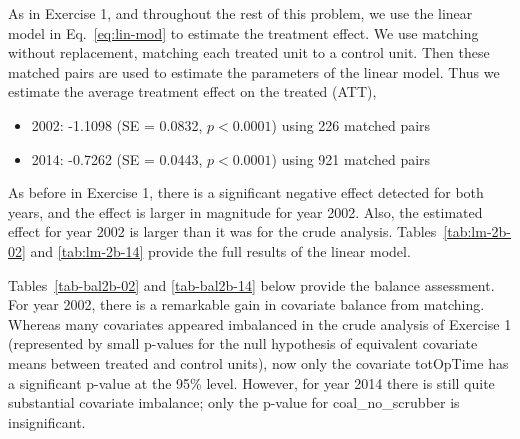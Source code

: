 \begin{enumerate}[(a)]
  As in Exercise 1, and throughout the rest of this problem, we use the
  linear model in Eq.~\eqref{eq:lin-mod} to estimate the treatment
  effect.  We use matching without replacement, matching each treated
  unit to a control unit.  Then these matched pairs are used to
  estimate the parameters of the linear model.  Thus we estimate the
  average treatment effect on the treated (ATT), 
  \begin{itemize}
  \item 2002: -1.1098 (SE = 0.0832, $p < 0.0001$) using 226 matched
    pairs
  \item 2014: -0.7262 (SE = 0.0443, $p < 0.0001$) using 921 matched
    pairs
  \end{itemize}
  As before in Exercise 1, there is a significant negative effect
  detected for both years, and the effect is larger in magnitude for
  year 2002.  Also, the estimated effect for year 2002 is larger than
  it was for the crude analysis.  Tables~\ref{tab:lm-2b-02} and
  \ref{tab:lm-2b-14} provide the full results of the linear model.

  Tables~\ref{tab-bal2b-02} and \ref{tab-bal2b-14} below provide the
  balance assessment.  For year 2002, there is a remarkable gain in
  covariate balance from matching.  Whereas many covariates appeared
  imbalanced in the crude analysis of Exercise 1 (represented by small
  p-values for the null hypothesis of equivalent covariate means
  between treated and control units), now only the covariate totOpTime
  has a significant p-value at the 95\% level.  However, for year 2014
  there is still quite substantial covariate imbalance; only the
  p-value for coal\_no\_scrubber is insignificant.

  


\end{enumerate}
